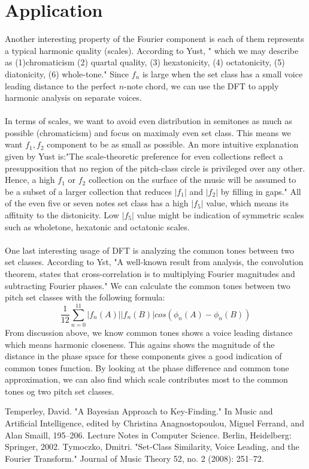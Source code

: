 \section*{Application}
Another interesting property of the Fourier component is each of them 
represents a typical harmonic quality (scales). According to Yust, "
which we may describe as (1)chromaticism (2) quartal quality, 
(3) hexatonicity, (4) octatonicity, (5) diatonicity, (6) whole-tone."
Since $f_n$ is large when the set class has a small voice leading distance 
to the perfect $n$-note chord, we can use the DFT to apply harmonic analysis
on separate voices. 
\\\\
In terms of scales, we want to avoid even distribution in
semitones as much as possible (chromaticism) and focus on maximaly even set class.
This means we want $f_1, f_2$ component to be as small as possible. An 
more intuitive explanation given by Yust is:"The scale-theoretic 
preference for even collections reflect a presupposition that 
no region of the pitch-class circle is privileged over any other. Hence, 
a high $f_1$ or $f_2$ collection on the surface of the music will 
be assumed to be a subset of a larger collection that reduces 
$|f_1|$ and $|f_2|$ by filling in gaps." All of the even five or
seven notes set class has a high $|f_5|$ value, which means its affitnity
to the distonicity. Low $|f_5|$ value might be indication of symmetric scales
such as wholetone, hexatonic and octatonic scales.
\\\\
One last interesting usage of DFT is analyzing the common tones between two set
classes. According to Yst, "A well-known result from analysis, 
the convolution theorem, states that cross-correlation is to 
multiplying Fourier magnitudes and subtracting Fourier phases." 
We can calculate the common tones between two pitch set classes with
the following formula:
\[\frac{1}{12}\sum_{n=0}^{11}|f_n(A)||f_n(B)|cos(\phi_n(A)-\phi_n(B))\]
From discussion above, we know common tones shows a voice leading distance
which means harmonic closeness. This agains shows the magnitude of the 
distance in the phase space for these components gives a good indication
of common tones function. By looking at the phase difference and common
tone approximation, we can also find which scale contributes most to the 
common tones og two pitch set classes.
\begin{thebibliography}{9}

Temperley, David. "A Bayesian Approach to Key-Finding." In Music and Artificial Intelligence, edited by Christina Anagnostopoulou, Miguel Ferrand, and Alan Smaill, 195–206. Lecture Notes in Computer Science. Berlin, Heidelberg: Springer, 2002.
Tymoczko, Dmitri. "Set-Class Similarity, Voice Leading, and the Fourier Transform." Journal of Music Theory 52, no. 2 (2008): 251–72.


\end{thebibliography}

